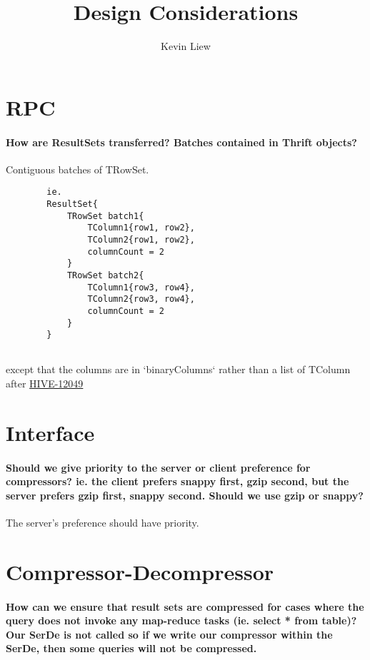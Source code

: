 \documentclass[11pt,a4paper]{article}
\title{Design Considerations}
\author{Kevin Liew}
\begin{document}
\maketitle

\section{RPC}
	
	\paragraph{How are ResultSets transferred? Batches contained in Thrift objects?}
	Contiguous batches of TRowSet.
	\begin{verbatim}
		ie.
		ResultSet{
		    TRowSet batch1{
		        TColumn1{row1, row2},
		        TColumn2{row1, row2},
		        columnCount = 2
		    }
		    TRowSet batch2{
		        TColumn1{row3, row4},
		        TColumn2{row3, row4},
		        columnCount = 2
		    }
		}
		
	\end{verbatim}
	except that the columns are in `binaryColumns` rather than a list of TColumn after \href{https://issues.apache.org/jira/browse/HIVE-12049}{HIVE-12049}

\section{Interface}
	
	\paragraph{Should we give priority to the server or client preference for compressors? ie. the client prefers snappy first, gzip second, but the server prefers gzip first, snappy second. Should we use gzip or snappy?}
	The server's preference should have priority.

\section{Compressor-Decompressor}
	
	\paragraph{How can we ensure that result sets are compressed for cases where the query does not invoke any map-reduce tasks (ie. select * from table)? Our SerDe is not called so if we write our compressor within the SerDe, then some queries will not be compressed.}\
	
\end{document}
